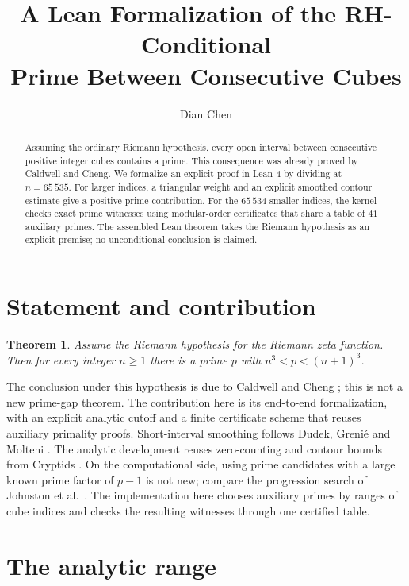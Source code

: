 \documentclass[10pt]{article}
\title{A Lean Formalization of the RH-Conditional\\ Prime Between Consecutive Cubes}
\author{Dian Chen}
\date{}
\newtheorem{theorem}{Theorem}
\begin{document}
\maketitle

\begin{abstract}
Assuming the ordinary Riemann hypothesis, every open interval between consecutive positive integer cubes contains a prime. This consequence was already proved by Caldwell and Cheng. We formalize an explicit proof in Lean 4 by dividing at \(n=65\,535\). For larger indices, a triangular weight and an explicit smoothed contour estimate give a positive prime contribution. For the \(65\,534\) smaller indices, the kernel checks exact prime witnesses using modular-order certificates that share a table of \(41\) auxiliary primes. The assembled Lean theorem takes the Riemann hypothesis as an explicit premise; no unconditional conclusion is claimed.
\end{abstract}

\section{Statement and contribution}

\begin{theorem}\label{thm:main}
Assume the Riemann hypothesis for the Riemann zeta function. Then for every integer \(n\ge 1\) there is a prime \(p\) with \(n^3<p<(n+1)^3\).
\end{theorem}

The conclusion under this hypothesis is due to Caldwell and Cheng \cite[Lemma~5]{cc}; this is not a new prime-gap theorem. The contribution here is its end-to-end formalization, with an explicit analytic cutoff and a finite certificate scheme that reuses auxiliary primality proofs. Short-interval smoothing follows Dudek, Greni\'e and Molteni \cite{dgm}. The analytic development reuses zero-counting and contour bounds from Cryptids \cite{cryptids}. On the computational side, using prime candidates with a large known prime factor of \(p-1\) is not new; compare the progression search of Johnston et al.\ \cite[Section~2]{jstw}. The implementation here chooses auxiliary primes by ranges of cube indices and checks the resulting witnesses through one certified table.

\section{The analytic range}
\end{document}
